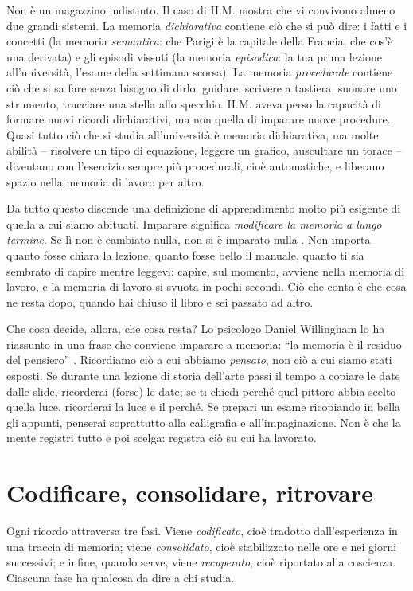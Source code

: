 Non è un magazzino indistinto. Il caso di H.M. mostra che vi convivono
almeno due grandi sistemi. La memoria \emph{dichiarativa} contiene ciò
che si può dire: i fatti e i concetti (la memoria \emph{semantica}: che
Parigi è la capitale della Francia, che cos'è una derivata) e gli
episodi vissuti (la memoria \emph{episodica}: la tua prima lezione
all'università, l'esame della settimana scorsa). La memoria
\emph{procedurale} contiene ciò che si sa fare senza bisogno di dirlo:
guidare, scrivere a tastiera, suonare uno strumento, tracciare una
stella allo specchio. H.M. aveva perso la capacità di formare nuovi
ricordi dichiarativi, ma non quella di imparare nuove procedure. Quasi
tutto ciò che si studia all'università è memoria dichiarativa, ma molte
abilità -- risolvere un tipo di equazione, leggere un grafico,
auscultare un torace -- diventano con l'esercizio sempre più
procedurali, cioè automatiche, e liberano spazio nella memoria di
lavoro per altro.

Da tutto questo discende una definizione di apprendimento molto più
esigente di quella a cui siamo abituati. Imparare significa
\emph{modificare la memoria a lungo termine}. Se lì non è cambiato
nulla, non si è imparato nulla \parencite{kirschner2006}. Non importa
quanto fosse chiara la lezione, quanto fosse bello il manuale, quanto
ti sia sembrato di capire mentre leggevi: capire, sul momento, avviene
nella memoria di lavoro, e la memoria di lavoro si svuota in pochi
secondi. Ciò che conta è che cosa ne resta dopo, quando hai chiuso il
libro e sei passato ad altro.

Che cosa decide, allora, che cosa resta? Lo psicologo Daniel Willingham
lo ha riassunto in una frase che conviene imparare a memoria:
\enquote{la memoria è il residuo del pensiero}
\parencite{willingham2009}. Ricordiamo ciò a cui abbiamo
\emph{pensato}, non ciò a cui siamo stati esposti. Se durante una
lezione di storia dell'arte passi il tempo a copiare le date dalle
slide, ricorderai (forse) le date; se ti chiedi perché quel pittore
abbia scelto quella luce, ricorderai la luce e il perché. Se prepari un
esame ricopiando in bella gli appunti, penserai soprattutto alla
calligrafia e all'impaginazione. Non è che la mente registri tutto e
poi scelga: registra ciò su cui ha lavorato.

\section{Codificare, consolidare, ritrovare}

Ogni ricordo attraversa tre fasi. Viene \emph{codificato}, cioè
tradotto dall'esperienza in una traccia di memoria; viene
\emph{consolidato}, cioè stabilizzato nelle ore e nei giorni
successivi; e infine, quando serve, viene \emph{recuperato}, cioè
riportato alla coscienza. Ciascuna fase ha qualcosa da dire a chi
studia.

